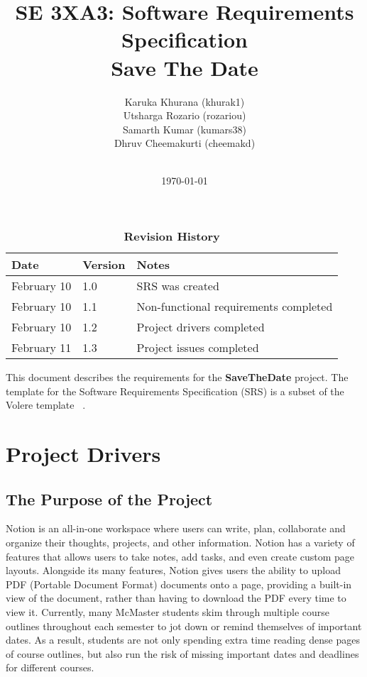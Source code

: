 \documentclass[12pt, titlepage]{article}
\title{SE 3XA3: Software Requirements Specification\\Save The Date}
\author{
        Karuka Khurana (khurak1)\\
        Utsharga Rozario (rozariou)\\
        Samarth Kumar (kumars38)\\
        Dhruv Cheemakurti (cheemakd)\\
        \\
}
\date{\today}
\begin{document}
\maketitle

\tableofcontents
\listoftables
\listoffigures

\begin{table}[bp]
\caption{\bf Revision History}
\begin{tabularx}{\textwidth}{p{3cm}p{2cm}X}
\toprule {\bf Date} & {\bf Version} & {\bf Notes}\\
\midrule
February 10 & 1.0 & SRS was created\\
February 10 & 1.1 & Non-functional requirements completed\\
February 10 & 1.2 & Project drivers completed\\
February 11 & 1.3 & Project issues completed\\
\bottomrule
\end{tabularx}
\end{table}

\newpage


This document describes the requirements for the \textbf{SaveTheDate} project. 
The template for the Software Requirements Specification (SRS) is a subset of the Volere
template ~\citep{RobertsonAndRobertson2012}.

\section{Project Drivers}

\subsection{The Purpose of the Project}
Notion is an all-in-one workspace where users can write, plan, collaborate and organize their thoughts, projects, and other information. Notion has a variety of features that allows users to take notes, add tasks, and even create custom page layouts. Alongside its many features, Notion gives users the ability to upload PDF (Portable Document Format) documents onto a page, providing a built-in view of the document, rather than having to download the PDF every time to view it. Currently, many McMaster students skim through multiple course outlines throughout each semester to jot down or remind themselves of important dates. As a result, students are not only spending extra time reading dense pages of course outlines, but also run the risk of missing important dates and deadlines for different courses.  
\end{document}
